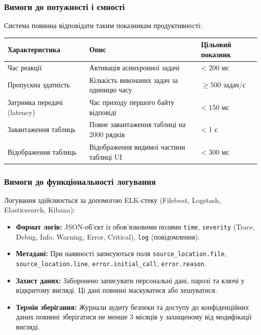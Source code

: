 \documentclass{article}
\begin{document}
\subsubsection{Вимоги до потужності і ємності}
Система повинна відповідати таким показникам продуктивності:
\begin{longtable}{p{5cm}p{5cm}p{4cm}}
\toprule
\textbf{Характеристика} & \textbf{Опис} & \textbf{Цільовий показник} \\
\midrule
Час реакції & Активація асинхронної задачі & \textless{} 200 мс \\
Пропускна здатність & Кількість виконаних задач за одиницю часу & $\ge 500$ задач/с \\
Затримка передачі (latency) & Час приходу першого байту відповіді & \textless{} 150 мс \\
Завантаження таблиць & Повне завантаження таблиці на 2000 рядків & \textless{} 1 с \\
Відображення таблиць & Відображення видимої частини таблиці UI & \textless{} 300 мс \\
\bottomrule
\end{longtable}

\subsubsection{Вимоги до функціональності логування}
Логування здійснюється за допомогою ELK-стеку (Filebeat, Logstash, Elasticsearch, Kibana):
\begin{itemize}
    \item \textbf{Формат логів:} JSON-об'єкт із обов'язковими полями \texttt{time}, \texttt{severity} (Trace, Debug, Info, Warning, Error, Critical), \texttt{log} (повідомлення).
    \item \textbf{Метадані:} При наявності записуються поля \texttt{source\_location.file}, \texttt{source\_location.line}, \texttt{error.initial\_call}, \texttt{error.reason}.
    \item \textbf{Захист даних:} Заборонено записувати персональні дані, паролі та ключі у відкритому вигляді. Ці дані повинні маскуватися або хешуватися.
    \item \textbf{Термін зберігання:} Журнали аудиту безпеки та доступу до конфіденційних даних повинні зберігатися не менше 3 місяців у захищеному від модифікації вигляді.
\end{itemize}
\end{document}
